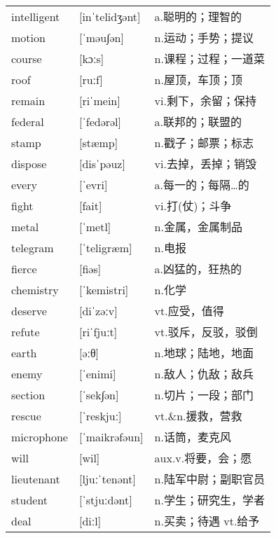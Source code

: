 \documentclass[a4paper]{article}
\begin{document}
\section{}
\begin{tabular}{l l l}

intelligent & [inˈtelidʒənt] & a.聪明的；理智的 \\
motion & [ˈməu∫ən] & n.运动；手势；提议 \\
course & [kɔːs] & n.课程；过程；一道菜 \\
roof & [ruːf] & n.屋顶，车顶；顶 \\
remain & [riˈmein] & vi.剩下，余留；保持 \\
federal & [ˈfedərəl] & a.联邦的；联盟的 \\
stamp & [stæmp] & n.戳子；邮票；标志 \\
dispose & [disˈpəuz] & vi.去掉，丢掉；销毁 \\
every & [ˈevri] & a.每一的；每隔…的 \\
fight & [fait] & vi.打(仗)；斗争 \\
metal & [ˈmetl] & n.金属，金属制品 \\
telegram & [ˈteligræm] & n.电报 \\
fierce & [fiəs] & a.凶猛的，狂热的 \\
chemistry & [ˈkemistri] & n.化学 \\
deserve & [diˈzəːv] & vt.应受，值得 \\
refute & [riˈfjuːt] & vt.驳斥，反驳，驳倒 \\
earth & [əːθ] & n.地球；陆地，地面 \\
enemy & [ˈenimi] & n.敌人；仇敌；敌兵 \\
section & [ˈsek∫ən] & n.切片；一段；部门 \\
rescue & [ˈreskjuː] & vt.\&n.援救，营救 \\
microphone & [ˈmaikrəfəun] & n.话筒，麦克风 \\
will & [wil] & aux.v.将要，会；愿 \\
lieutenant & [ljuːˈtenənt] & n.陆军中尉；副职官员 \\
student & [ˈstjuːdənt] & n.学生；研究生，学者 \\
deal & [diːl] & n.买卖；待遇 vt.给予 \\

\end{tabular}
\end{document}
